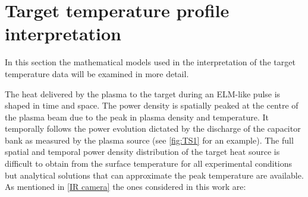 \section{Target temperature profile interpretation}\label{Target temperature profile interpretation}
In this section the mathematical models used in the interpretation of the target temperature data will be examined in more detail.

The heat delivered by the plasma to the target during an ELM-like pulse is shaped in time and space. The power density is spatially peaked at the centre of the plasma beam due to the peak in plasma density and temperature. It temporally follows the power evolution dictated by the discharge of the capacitor bank as measured by the plasma source (see \autoref{fig:TS1} for an example). The full spatial and temporal power density distribution of the target heat source is difficult to obtain from the surface temperature for all experimental conditions but analytical solutions that can approximate the peak temperature are available. As mentioned in \autoref{IR camera} the ones considered in this work are:

